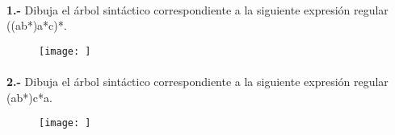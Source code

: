 \documentclass[11pt,a4paper]{report}
\begin{document}
\paragraph{}

\paragraph{}
\textbf{1.-} Dibuja el árbol sintáctico correspondiente a la siguiente expresión regular ((a\textbar b*)a*c)*. 
\begin{figure}[ht!]
\centering
\texttt{[image: ]}
\end{figure}\paragraph{}
\textbf{2.-} Dibuja el árbol sintáctico correspondiente a la siguiente expresión regular (a\textbar b*)c*a. 
\begin{figure}[ht!]
\centering
\texttt{[image: ]}
\end{figure}
\end{document}

